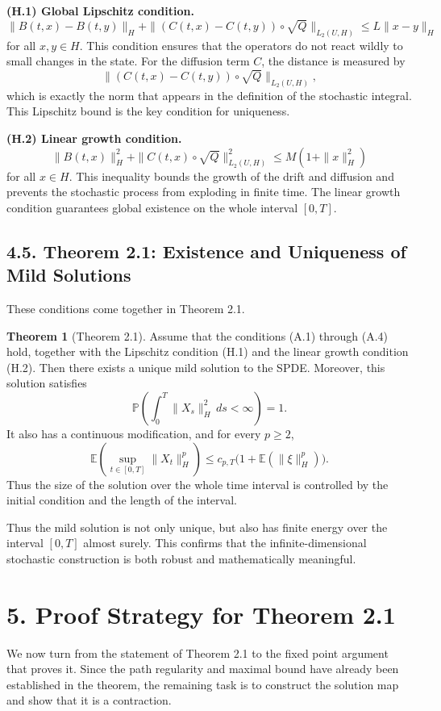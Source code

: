 \documentclass[11pt]{article}
\theoremstyle{definition}
\newtheorem{theorem}{Theorem}
\theoremstyle{remark}
\begin{document}
\textbf{(H.1) Global Lipschitz condition.}
\[
\|B(t,x)-B(t,y)\|_H+\|(C(t,x)-C(t,y))\circ \sqrt Q\|_{L_2(U,H)}
\le
L\|x-y\|_H
\]
for all \(x,y\in H\). This condition ensures that the operators do not react wildly to small changes in the state. For the diffusion term \(C\), the distance is measured by
\[
\|(C(t,x)-C(t,y))\circ \sqrt Q\|_{L_2(U,H)},
\]
which is exactly the norm that appears in the definition of the stochastic integral. This Lipschitz bound is the key condition for uniqueness.

\textbf{(H.2) Linear growth condition.}
\[
\|B(t,x)\|_H^2+\|C(t,x)\circ \sqrt Q\|_{L_2(U,H)}^2
\le
M(1+\|x\|_H^2)
\]
for all \(x\in H\). This inequality bounds the growth of the drift and diffusion and prevents the stochastic process from exploding in finite time. The linear growth condition guarantees global existence on the whole interval \([0,T]\).

\subsection*{4.5. Theorem 2.1: Existence and Uniqueness of Mild Solutions}
These conditions come together in Theorem 2.1.

\begin{theorem}[Theorem 2.1]
Assume that the conditions \textnormal{(A.1)} through \textnormal{(A.4)} hold, together with the Lipschitz condition \textnormal{(H.1)} and the linear growth condition \textnormal{(H.2)}. Then there exists a unique mild solution to the SPDE. Moreover, this solution satisfies
\[
\mathbb P\left(\int_0^T \|X_s\|_H^2\,ds<\infty\right)=1.
\]
It also has a continuous modification, and for every \(p\ge 2\),
\[
\mathbb E\left(\sup_{t\in[0,T]}\|X_t\|_H^p\right)
\le
c_{p,T}\bigl(1+\mathbb E(\|\xi\|_H^p)\bigr).
\]
Thus the size of the solution over the whole time interval is controlled by the initial condition and the length of the interval.
\end{theorem}

Thus the mild solution is not only unique, but also has finite energy over the interval \([0,T]\) almost surely. This confirms that the infinite-dimensional stochastic construction is both robust and mathematically meaningful.

\section*{5. Proof Strategy for Theorem 2.1}
We now turn from the statement of Theorem 2.1 to the fixed point argument that proves it. Since the path regularity and maximal bound have already been established in the theorem, the remaining task is to construct the solution map and show that it is a contraction.
\end{document}

